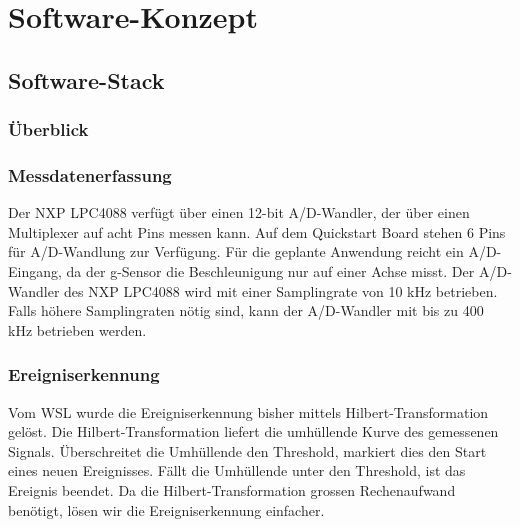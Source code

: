 %
%

\chapter{Software-Konzept}\label{chap.software}


\section{Software-Stack}\label{sec.sw_stack}


\subsection{Überblick}\label{subsec.sw_ueberblick}


\subsection{Messdatenerfassung}\label{subsec.sw_messen}
Der NXP LPC4088 verfügt über einen 12-bit A/D-Wandler, der über einen Multiplexer auf acht Pins messen kann. Auf dem Quickstart Board stehen 6 Pins für A/D-Wandlung zur Verfügung. Für die geplante Anwendung reicht ein A/D-Eingang, da der g-Sensor die Beschleunigung nur auf einer Achse misst. Der A/D-Wandler des NXP LPC4088 wird mit einer Samplingrate von 10 kHz betrieben. Falls höhere Samplingraten nötig sind, kann der A/D-Wandler mit bis zu 400 kHz betrieben werden.



\subsection{Ereigniserkennung}\label{subsec.sw_ereignis}
Vom WSL wurde die Ereigniserkennung bisher mittels Hilbert-Transformation gelöst. Die Hilbert-Transformation liefert die umhüllende Kurve des gemessenen Signals. Überschreitet die Umhüllende den Threshold, markiert dies den Start eines neuen Ereignisses. Fällt die Umhüllende unter den Threshold, ist das Ereignis beendet. Da die Hilbert-Transformation grossen Rechenaufwand benötigt, lösen wir die Ereigniserkennung einfacher.


